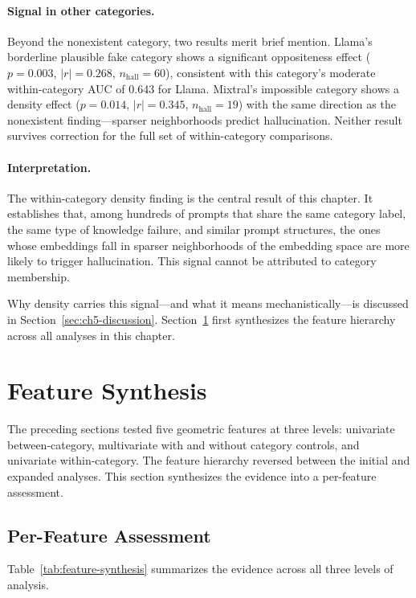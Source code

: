 \paragraph{Signal in other categories.} Beyond the nonexistent category, two results merit brief mention. Llama's borderline plausible fake category shows a significant oppositeness effect ($p = 0.003$, $|r| = 0.268$, $n_{\text{hall}} = 60$), consistent with this category's moderate within-category AUC of 0.643 for Llama. Mixtral's impossible category shows a density effect ($p = 0.014$, $|r| = 0.345$, $n_{\text{hall}} = 19$) with the same direction as the nonexistent finding---sparser neighborhoods predict hallucination. Neither result survives correction for the full set of within-category comparisons.

\paragraph{Interpretation.} The within-category density finding is the central result of this chapter. It establishes that, among hundreds of prompts that share the same category label, the same type of knowledge failure, and similar prompt structures, the ones whose embeddings fall in sparser neighborhoods of the embedding space are more likely to trigger hallucination. This signal cannot be attributed to category membership.

Why density carries this signal---and what it means mechanistically---is discussed in Section~\ref{sec:ch5-discussion}. Section~\ref{sec:feature-synthesis} first synthesizes the feature hierarchy across all analyses in this chapter.

\section{Feature Synthesis}
\label{sec:feature-synthesis}

The preceding sections tested five geometric features at three levels: univariate between-category, multivariate with and without category controls, and univariate within-category. The feature hierarchy reversed between the initial and expanded analyses. This section synthesizes the evidence into a per-feature assessment.

\subsection{Per-Feature Assessment}

Table~\ref{tab:feature-synthesis} summarizes the evidence across all three levels of analysis.

